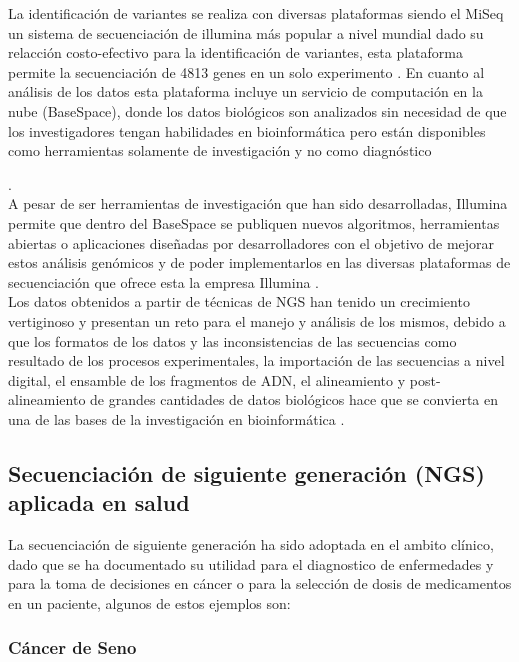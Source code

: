 La identificación de variantes se realiza con diversas plataformas siendo el MiSeq un sistema de secuenciación de illumina  más popular a nivel mundial dado su relacción costo-efectivo para la identificación de variantes, esta plataforma permite la secuenciación de 4813 genes en un solo experimento \cite{Illumina2017}. En cuanto al análisis de los datos esta plataforma incluye un servicio de computación en la nube (BaseSpace), donde los datos biológicos son analizados  sin necesidad de que los investigadores tengan habilidades en bioinformática pero están disponibles como herramientas solamente de investigación y no como diagnóstico {\cite{Illumina2017}. \\

A pesar de ser herramientas de investigación  que han sido desarrolladas, Illumina permite que dentro del BaseSpace se publiquen nuevos algoritmos, herramientas abiertas o aplicaciones diseñadas por desarrolladores con el objetivo de mejorar estos análisis genómicos y  de poder implementarlos en las diversas plataformas de secuenciación que ofrece esta la empresa Illumina \cite{Illumina2017}. \\

Los datos obtenidos a partir de técnicas de NGS han tenido un crecimiento vertiginoso y presentan un reto para el manejo y análisis de los mismos, debido a que los formatos de los datos y las inconsistencias de las secuencias como resultado de los procesos experimentales, la importación de las secuencias a nivel digital, el ensamble de los fragmentos de ADN, el alineamiento y post-alineamiento de grandes cantidades de datos biológicos hace que se convierta en una de las bases de la investigación en bioinformática \cite{Deng2011,Triplet2014}.

\subsection{Secuenciación de siguiente generación (NGS) aplicada en salud}

La secuenciación de siguiente generación ha sido adoptada en el ambito clínico, dado que se ha documentado su utilidad para el diagnostico de enfermedades  y para la toma de decisiones en cáncer o para la selección de dosis de medicamentos en un paciente, \cite{Lubin2017} algunos de estos ejemplos son:

\subsubsection*{Cáncer de Seno}

}
